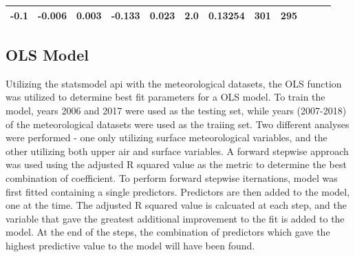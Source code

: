 \documentclass[11pt]{article}
\begin{document}
\begin{longtable}[]{@{}llllllllllll@{}}
\begin{minipage}[t]{0.04\columnwidth}
-0.1\strut
\end{minipage} & \begin{minipage}[t]{0.04\columnwidth}\raggedright\strut
-0.006\strut
\end{minipage} & \begin{minipage}[t]{0.05\columnwidth}\raggedright\strut
0.003\strut
\end{minipage} & \begin{minipage}[t]{0.04\columnwidth}\raggedright\strut
-0.133\strut
\end{minipage} & \begin{minipage}[t]{0.04\columnwidth}\raggedright\strut
0.023\strut
\end{minipage} & \begin{minipage}[t]{0.05\columnwidth}\raggedright\strut
2.0\strut
\end{minipage} & \begin{minipage}[t]{0.05\columnwidth}\raggedright\strut
0.13254\strut
\end{minipage} & \begin{minipage}[t]{0.05\columnwidth}\raggedright\strut
301\strut
\end{minipage} & \begin{minipage}[t]{0.07\columnwidth}\raggedright\strut
295\strut
\end{minipage}\tabularnewline
\bottomrule
\end{longtable}

\subsection{OLS Model}\label{ols-model}

Utilizing the statsmodel api with the meteorological datasets, the OLS
function was utilized to determine best fit parameters for a OLS model.
To train the model, years 2006 and 2017 were used as the testing set,
while years (2007-2018) of the meteorological datasets were used as the
traiing set. Two different analyses were performed - one only utilizing
surface meteorological variables, and the other utilizing both upper air
and surface variables. A forward stepwise approach was used using the
adjusted R squared value as the metric to determine the best combination
of coefficient. To perform forward stepwise iternations, model was first
fitted containing a single predictors. Predictors are then added to the
model, one at the time. The adjusted R squared value is calcuated at
each step, and the variable that gave the greatest additional
improvement to the fit is added to the model. At the end of the steps,
the combination of predictors which gave the highest predictive value to
the model will have been found.
\end{document}
